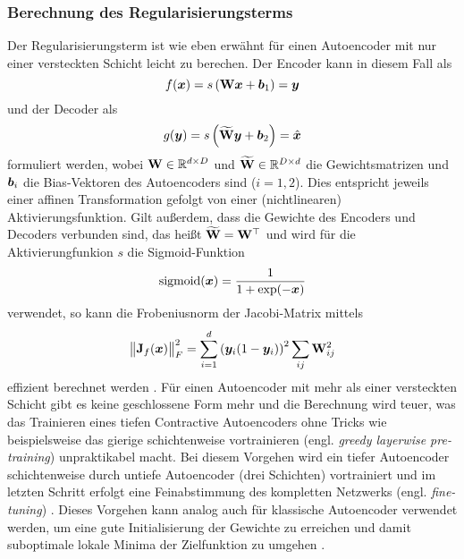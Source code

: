 \subsubsection{Berechnung des Regularisierungsterms}
\label{ch:MethodenDerDimRed:ML:CAE:BerechnungRegTerm}
Der Regularisierungsterm ist wie eben erwähnt für einen Autoencoder mit nur einer versteckten Schicht leicht zu berechen. Der Encoder
kann in diesem Fall als
\begin{equation}
	f(\vect{x}) = s \left( \mat{W} \vect{x} + \vect{b}_1 \right) = \vect{y}
\end{equation}
und der Decoder als
\begin{equation}
	g(\vect{y}) = s \left( \mat{\widetilde{W}} \vect{y} + \vect{b}_2 \right) = \estNormal{\vect{x}}
\end{equation}
formuliert werden, wobei $\mat{W} \in \real^{d \times D}$ und $\mat{\widetilde{W}} \in \real^{D \times d}$ die Gewichtsmatrizen und $\vect{b}_i$ die Bias-Vektoren des Autoencoders sind ($i = 1, 2$). Dies entspricht jeweils einer affinen Transformation gefolgt von einer (nichtlinearen) Aktivierungsfunktion. Gilt außerdem, dass die Gewichte des Encoders und Decoders verbunden sind, das heißt $\mat{\widetilde{W}} = \tr{\mat{W}}$ und wird für die Aktivierungfunkion $s$ die Sigmoid-Funktion
\begin{equation}
	\operatorname{sigmoid}(\vect{x}) = \frac{1}{1 + \exp (-\vect{x})}
\end{equation}
verwendet, so kann die Frobeniusnorm der Jacobi-Matrix mittels
\begin{equation}
	\norm[\big]{\mat{J}_f(\vect{x})}_F^2 = \sum_{i = 1}^d \left( \vect{y}_i (1 - \vect{y}_i)\right)^2 \sum_{ij} \mat{W}^2_{ij}
\end{equation}
effizient berechnet werden \parencite[4]{Rifai.2011}. Für einen Autoencoder mit mehr als einer versteckten Schicht gibt es keine
geschlossene Form mehr und die Berechnung wird teuer, was das Trainieren eines tiefen Contractive
Autoencoders ohne Tricks wie beispielsweise das gierige schichtenweise vortrainieren (engl.
\textit{greedy layerwise pre-training}) unpraktikabel macht. Bei diesem Vorgehen wird ein tiefer
Autoencoder schichtenweise durch untiefe Autoencoder (drei Schichten) vortrainiert und im letzten
Schritt erfolgt eine Feinabstimmung des kompletten Netzwerks (engl. \textit{fine-tuning}) \parencite[522]{Goodfellow.2016}. Dieses Vorgehen kann analog auch für klassische Autoencoder verwendet
werden, um eine gute Initialisierung der Gewichte zu erreichen und damit suboptimale lokale Minima
der Zielfunktion zu umgehen \parencite[509]{Goodfellow.2016}.